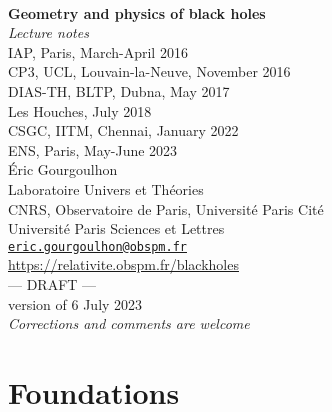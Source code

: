 \documentclass[12pt,a4paper]{book}
\begin{document}
\begin{titlepage}
\
\vspace{4cm}
\begin{center}
{\Huge\textbf{Geometry and physics of black holes}}\\[2ex]
{\Huge\emph{Lecture notes}}\\[3ex]
{\Large IAP, Paris, March-April 2016} \\[1ex]
{\Large CP3, UCL, Louvain-la-Neuve, November 2016}\\[1ex]
{\Large DIAS-TH, BLTP, Dubna, May 2017}\\[1ex]
{\Large Les Houches, July 2018}\\[1ex]
{\Large CSGC, IITM, Chennai, January 2022}\\[1ex]
{\Large ENS, Paris, May-June 2023}\\[8ex]
Éric Gourgoulhon \\
Laboratoire Univers et Théories \\
CNRS, Observatoire de Paris, Université Paris Cité\\
Université Paris Sciences et Lettres\\
\href{mailto:eric.gourgoulhon@obspm.fr}{\texttt{eric.gourgoulhon@obspm.fr}}\\[8ex]
\url{https://relativite.obspm.fr/blackholes}\\[8ex]
{\Huge --- DRAFT ---}\\[2ex]
{version of 6 July 2023}\\[2ex]
\emph{\Large Corrections and comments are welcome}
\end{center}
\end{titlepage}


\dominitoc

\newpage


\tableofcontents

\part{Foundations}





\end{document}

